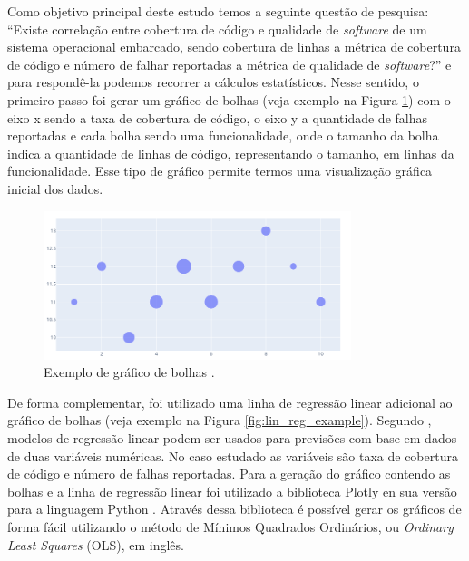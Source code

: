 \documentclass[11.5pt]{article}
\begin{document}
Como objetivo principal deste estudo temos a seguinte questão de pesquisa:
``Existe correlação entre cobertura de código e qualidade de \textit{software} de um sistema
operacional embarcado, sendo cobertura de linhas a métrica de cobertura de código e número de falhar
reportadas a métrica de qualidade de \textit{software}?'' e para respondê-la podemos recorrer a
cálculos estatísticos.
Nesse sentido, o primeiro passo foi gerar um gráfico de bolhas (veja exemplo na
Figura \ref{fig:bubble_example}) com o eixo x sendo a taxa de cobertura de código, o eixo y a
quantidade de falhas reportadas e cada bolha sendo uma funcionalidade, onde o tamanho da bolha
indica a quantidade de linhas de código, representando o tamanho, em linhas da funcionalidade.
Esse tipo de gráfico permite termos uma visualização gráfica inicial dos dados.

\begin{figure}[ht]
    \centering
    \includegraphics[width=0.8\textwidth]{bubble_example.png}
    \caption{Exemplo de gráfico de bolhas \cite{plotly}.}
    \label{fig:bubble_example}
\end{figure}

De forma complementar, foi utilizado uma linha de regressão linear adicional ao gráfico de bolhas
(veja exemplo na Figura \ref{fig:lin_reg_example}).
Segundo \cite{openIntroStat}, modelos de regressão linear podem ser usados para previsões com base
em dados de duas variáveis numéricas.
No caso estudado as variáveis são taxa de cobertura de código e número de falhas reportadas.
Para a geração do gráfico contendo as bolhas e a linha de regressão linear foi utilizado a
biblioteca Plotly en sua versão para a linguagem Python \cite{plotly}.
Através dessa biblioteca é possível gerar os gráficos de forma fácil utilizando o método de Mínimos
Quadrados Ordinários, ou \textit{Ordinary Least Squares} (OLS), em inglês.
\end{document}
